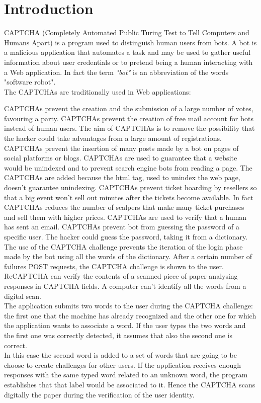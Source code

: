 \chapter{Introduction}
CAPTCHA (Completely Automated Public Turing Test to Tell Computers and Humans Apart) is a program used to distinguish human users from bots. A bot is a malicious application that automates a task and may be used to gather useful information about user credentials or to pretend being a human interacting with a Web application. In fact the term \textit{"bot"} is an abbreviation of the words "software robot".\\
The CAPTCHAs are traditionally used in Web applications\cite{text_audio}:
\begin{itemize}
{CAPTCHAs prevent the creation and the submission of a large number of votes, favouring a party.}
{CAPTCHAs prevent the creation of free mail account for bots instead of human users. The aim of CAPTCHAs is to remove the possibility that the hacker could take advantages from a large amount of registrations.}
{CAPTCHAs prevent the insertion of many posts made by a bot on pages of social platforms or blogs.}
{CAPTCHAs are used to guarantee that a website would be unindexed and to prevent search engine bots from reading a page. The CAPTCHAs are added because the html tag, used to unindex the web page, doesn't guarantee unindexing.}
{CAPTCHAs prevent ticket hoarding by resellers so that a big event won't sell out minutes after the tickets become available. In fact CAPTCHAs reduces the number of scalpers that make many ticket purchases and sell them with higher prices.}
{CAPTCHAs are used to verify that a human has sent an email.}
{CAPTCHAs prevent bot from guessing the password of a specific user. The hacker could guess the password, taking it from a dictionary. The use of the CAPTCHA challenge prevents the iteration of the login phase made by the bot using all the words of the dictionary. After a certain number of failures POST requests, the CAPTCHA challenge is shown to the user.}
{ReCAPTCHA can verify the contents of a scanned piece of paper analysing responses in CAPTCHA fields. A computer can't identify all the words from a digital scan.\\
The application submits two words to the user during the CAPTCHA challenge: the first one that the machine has already recognized and the other one for which the application wants to associate a word. If the user types the two words and the first one was correctly detected, it assumes that also the second one is correct.\\
In this case the second word is added to a set of words that are going to be choose to create challenges for other users. If the application receives enough responses with the same typed word related to an unknown word, the program establishes that that label would be associated to it. Hence the CAPTCHA scans digitally the paper during the verification of the user identity.}
\end{itemize}
